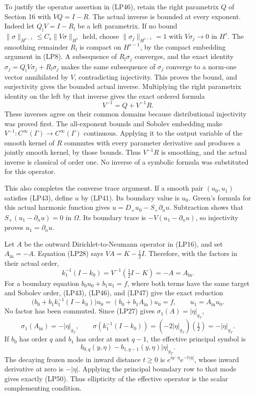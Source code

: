 \documentclass[
  11pt,
]{article}
\begin{document}
To justify the operator assertion in (LP46), retain the right parametrix
\(Q\) of Section 16 with \(VQ=I-R\). The actual inverse is bounded at
every exponent. Indeed let \(Q_{\mathrm l}V=I-R_{\mathrm l}\) be a left
parametrix. If no bound \(\|\sigma\|_{H^{s-1}}\le C_s\|V\sigma\|_{H^s}\)
held, choose \(\|\sigma_j\|_{H^{s-1}}=1\) with \(V\sigma_j\to0\) in
\(H^s\). The smoothing remainder \(R_{\mathrm l}\) is compact on
\(H^{s-1}\), by the compact embedding argument in (LP8). A subsequence
of \(R_{\mathrm l}\sigma_j\) converges, and the exact identity
\(\sigma_j=Q_{\mathrm l}V\sigma_j+R_{\mathrm l}\sigma_j\) makes the same
subsequence of \(\sigma_j\) converge to a norm-one vector annihilated by
\(V\), contradicting injectivity. This proves the bound, and
surjectivity gives the bounded actual inverse. Multiplying the right
parametrix identity on the left by that inverse gives the exact ordered
formula \[
 V^{-1}=Q+V^{-1}R.
 \tag{BR5}
\] These inverses agree on their common domains because distributional
injectivity was proved first. The all-exponent bounds and Sobolev
embedding make \(V^{-1}:C^\infty(\Gamma)\to C^\infty(\Gamma)\)
continuous. Applying it to the output variable of the smooth kernel of
\(R\) commutes with every parameter derivative and produces a jointly
smooth kernel, by those bounds. Thus \(V^{-1}R\) is smoothing, and the
actual inverse is classical of order one. No inverse of a symbolic
formula was substituted for this operator.

This also completes the converse trace argument. If a smooth pair
\((u_0,u_1)\) satisfies (LP43), define \(u\) by (LP41). Its boundary
value is \(u_0\). Green's formula for this actual harmonic function
gives \(u=D_+u_0-S_+\partial_nu\). Subtraction shows that
\(S_+(u_1-\partial_nu)=0\) in \(\Omega\). Its boundary trace is
\(-V(u_1-\partial_nu)\), so injectivity proves \(u_1=\partial_nu\).

Let \(A\) be the outward Dirichlet-to-Neumann operator in (LP16), and
set \(A_{\mathrm{in}}=-A\). Equation (LP28) says \(VA=K-\tfrac12I\).
Therefore, with the factors in their actual order, \[
 k_1^{-1}(I-k_0)
 =V^{-1}(\tfrac12I-K)
 =-A=A_{\mathrm{in}}.
 \tag{LP47}
\] For a boundary equation \(b_0u_0+b_1u_1=f\), where both terms have
the same target and Sobolev order, (LP43), (LP46), and (LP47) give the
exact reduction \[
 \bigl(b_0+b_1k_1^{-1}(I-k_0)\bigr)u_0
 =(b_0+b_1A_{\mathrm{in}})u_0=f,\qquad
 u_1=A_{\mathrm{in}}u_0.
 \tag{LP48}
\] No factor has been commuted. Since (LP27) gives
\(\sigma_1(A)=|\eta|_{g_\Gamma}\), \[
 \sigma_1(A_{\mathrm{in}})=-|\eta|_{g_\Gamma},\qquad
 \sigma\!\left(k_1^{-1}(I-k_0)\right)
 =(-2|\eta|_{g_\Gamma})(\tfrac12)=-|\eta|_{g_\Gamma}.
 \tag{LP49}
\] If \(b_0\) has order \(q\) and \(b_1\) has order at most \(q-1\), the
effective principal symbol is \[
 b_{0,q}(y,\eta)-b_{1,q-1}(y,\eta)|\eta|_{g_\Gamma}.
 \tag{LP50}
\] The decaying frozen mode in inward distance \(t\ge0\) is
\(e^{iy\cdot\eta}e^{-t|\eta|}\), whose inward derivative at zero is
\(-|\eta|\). Applying the principal boundary row to that mode gives
exactly (LP50). Thus ellipticity of the effective operator is the scalar
complementing condition.
\end{document}
